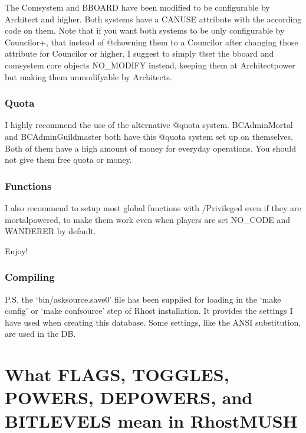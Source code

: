 \documentclass[letterpaper,10pt,english]{sphinxmanual}
\begin{document}
\sphinxAtStartPar
The Comsystem and BBOARD have been modified to be configurable by Architect and
higher. Both systems have a CANUSE attribute with the according code on them.
Note that if you want both systems to be only configurable by Councilor+, that
instead of @chowning them to a Councilor after changing those attribute for
Councilor or higher, I suggest to simply @set the bboard and comsystem core
objects NO\_MODIFY instead, keeping them at Architect\sphinxhyphen{}power but making them
unmodifyable by Architects.


\subsection{Quota}
\label{\detokenize{gettingstarted:quota}}
\sphinxAtStartPar
I highly recommend the use of the alternative @quota system. BC\sphinxhyphen{}Admin\sphinxhyphen{}Mortal
and BC\sphinxhyphen{}Admin\sphinxhyphen{}Guildmaster both have this @quota system set up on themselves. Both
of them have a high amount of money for everyday operations. You should not give
them free quota or money.


\subsection{Functions}
\label{\detokenize{gettingstarted:id1}}
\sphinxAtStartPar
I also recommend to setup most global functions with /Privileged even if they
are mortal\sphinxhyphen{}powered, to make them work even when players are set NO\_CODE and
WANDERER by default.

\sphinxAtStartPar
Enjoy!


\subsection{Compiling}
\label{\detokenize{gettingstarted:compiling}}
\sphinxAtStartPar
P.S. the ‘bin/asksource.save0’ file has been supplied for loading in the
‘make config’ or ‘make confsource’ step of Rhost installation. It provides the
settings I have used when creating this database. Some settings, like the ANSI
substitution, are used in the DB.

\sphinxAtStartPar
{}


\chapter{What FLAGS, TOGGLES, POWERS, DEPOWERS, and BITLEVELS mean in RhostMUSH}
\label{\detokenize{toggles:what-flags-toggles-powers-depowers-and-bitlevels-mean-in-rhostmush}}\label{\detokenize{toggles::doc}}
\end{document}
